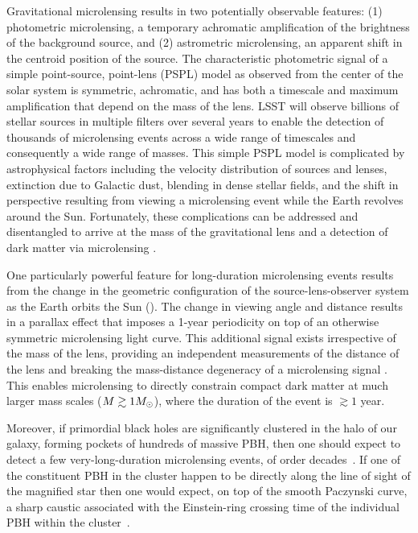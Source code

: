 Gravitational microlensing results in two potentially observable features: (1) photometric microlensing, a temporary achromatic amplification of the brightness of the background source, and (2) astrometric microlensing, an apparent shift in the centroid position of the source.
The characteristic photometric signal of a simple point-source, point-lens (PSPL) model as observed from the center of the solar system is symmetric, achromatic, and has both a timescale and maximum amplification that depend on the mass of the lens.
LSST will observe billions of stellar sources in multiple filters over several years to enable the detection of thousands of microlensing events across a wide range of timescales and consequently a wide range of masses.
This simple PSPL model is complicated by astrophysical factors including the velocity distribution of sources and lenses, extinction due to Galactic dust, blending in dense stellar fields, and the shift in perspective resulting from viewing a microlensing event while the Earth revolves around the Sun.
Fortunately, these complications can be addressed and disentangled to arrive at the mass of the gravitational lens and a detection of dark matter via microlensing \citep{1405.3134,1509.04899}.

One particularly powerful feature for long-duration microlensing events results from the change in the geometric configuration of the source-lens-observer system as the Earth orbits the Sun ().
The change in viewing angle and distance results in a parallax effect that imposes a 1-year periodicity on top of an otherwise symmetric microlensing light curve.
This additional signal exists irrespective of the mass of the lens, providing an independent measurements of the distance of the lens and breaking the mass-distance degeneracy of a microlensing signal \citep[\eg][]{1509.04899}.
This enables microlensing to directly constrain compact dark matter at much larger mass scales ($M \gtrsim 1M_\odot$), where the duration of the event is $\gtrsim 1$ year. 

Moreover, if primordial black holes are significantly clustered in the halo of our galaxy, forming pockets of hundreds of massive PBH, then one should expect to detect a few very-long-duration microlensing events, of order decades~\citep{Bellido:2017}. If one of the constituent PBH in the cluster happen to be directly along the line of sight of the magnified star then one would expect, on top of the smooth Paczynski curve, a sharp caustic associated with the Einstein-ring crossing time of the individual PBH within the cluster~\citep{Bellido:2018}.

